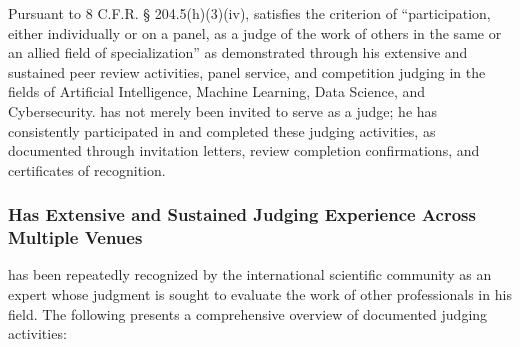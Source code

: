 

Pursuant to 8 C.F.R. § 204.5(h)(3)(iv), \dr satisfies the criterion of ``participation, either individually or on a panel, as a judge of the work of others in the same or an allied field of specialization'' as demonstrated through his extensive and sustained peer review activities, panel service, and competition judging in the fields of Artificial Intelligence, Machine Learning, Data Science, and Cybersecurity. \dr has not merely been invited to serve as a judge; he has consistently participated in and completed these judging activities, as documented through invitation letters, review completion confirmations, and certificates of recognition.


\subsubsection{\dr Has Extensive and Sustained Judging Experience Across Multiple Venues}
\label{judge:overview}

\dr has been repeatedly recognized by the international scientific community as an expert whose judgment is sought to evaluate the work of other professionals in his field. The following presents a comprehensive overview of \drs documented judging activities:

